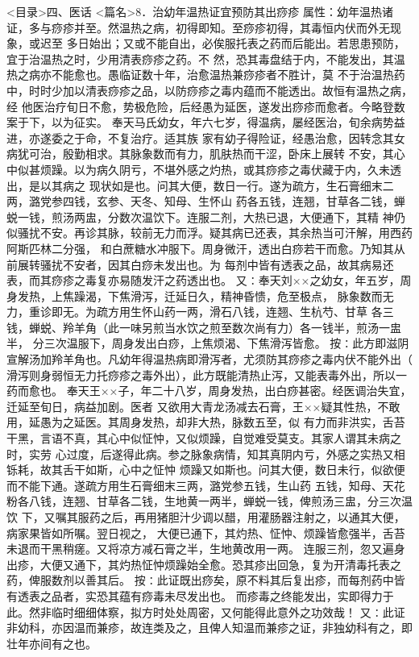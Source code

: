 \documentclass[a4paper,12pt,UTF8,twoside]{ctexbook}
\begin{document}
<目录>四、医话
<篇名>8．治幼年温热证宜预防其出痧疹
属性：幼年温热诸证，多与痧疹并至。然温热之病，初得即知。至痧疹初得，其毒恒内伏而外无现象，或迟至 
多日始出；又或不能自出，必俟服托表之药而后能出。若思患预防，宜于治温热之时，少用清表痧疹之药。不 
然，恐其毒盘结于内，不能发出，其温热之病亦不能愈也。愚临证数十年，治愈温热兼痧疹者不胜计，莫 
不于治温热药中，时时少加以清表痧疹之品，以防痧疹之毒内蕴而不能透出。故恒有温热之病，经 
他医治疗旬日不愈，势极危险，后经愚为延医，遂发出痧疹而愈者。今略登数案于下，以为征实。 
奉天马氏幼女，年六七岁，得温病，屡经医治，旬余病势益进，亦遂委之于命，不复治疗。适其族 
家有幼子得险证，经愚治愈，因转念其女病犹可治，殷勤相求。其脉象数而有力，肌肤热而干涩，卧床上展转 
不安，其心中似甚烦躁。以为病久阴亏，不堪外感之灼热，或其痧疹之毒伏藏于内，久未透出，是以其病之 
现状如是也。问其大便，数日一行。遂为疏方，生石膏细末二两，潞党参四钱，玄参、天冬、知母、生怀山 
药各五钱，连翘，甘草各二钱，蝉蜕一钱，煎汤两盅，分数次温饮下。连服二剂，大热已退，大便通下，其精 
神仍似骚扰不安。再诊其脉，较前无力而浮。疑其病已还表，其余热当可汗解，用西药阿斯匹林二分强， 
和白蔗糖水冲服下。周身微汗，透出白痧若干而愈。乃知其从前展转骚扰不安者，因其白痧未发出也。为 
每剂中皆有透表之品，故其病易还表，而其痧疹之毒复亦易随发汗之药透出也。 
又∶奉天刘××之幼女，年五岁，周身发热，上焦躁渴，下焦滑泻，迁延日久，精神昏愦，危至极点， 
脉象数而无力，重诊即无。为疏方用生怀山药一两，滑石八钱，连翘、生杭芍、甘草 
各三钱，蝉蜕、羚羊角（此一味另煎当水饮之煎至数次尚有力）各一钱半，煎汤一盅半， 
分三次温服下，周身发出白痧，上焦烦渴、下焦滑泻皆愈。 
按∶此方即滋阴宣解汤加羚羊角也。凡幼年得温热病即滑泻者，尤须防其痧疹之毒内伏不能外出（ 
滑泻则身弱恒无力托痧疹之毒外出），此方既能清热止泻，又能表毒外出，所以一药而愈也。 
奉天王××子，年二十八岁，周身发热，出白痧甚密。经医调治失宜，迁延至旬日，病益加剧。医者 
又欲用大青龙汤减去石膏，王××疑其性热，不敢用，延愚为之延医。其周身发热，却非大热，脉数五至，似 
有力而非洪实，舌苔干黑，言语不真，其心中似怔忡，又似烦躁，自觉难受莫支。其家人谓其未病之时，实劳 
心过度，后遂得此病。参之脉象病情，知其真阴内亏，外感之实热又相铄耗，故其舌干如斯，心中之怔忡 
烦躁又如斯也。问其大便，数日未行，似欲便而不能下通。遂疏方用生石膏细末三两，潞党参五钱，生山药 
五钱，知母、天花粉各八钱，连翘、甘草各二钱，生地黄一两半，蝉蜕一钱，俾煎汤三盅，分三次温饮 
下，又嘱其服药之后，再用猪胆汁少调以醋，用灌肠器注射之，以通其大便，病家果皆如所嘱。翌日视之， 
大便已通下，其灼热、怔忡、烦躁皆愈强半，舌苔未退而干黑稍瘥。又将凉方减石膏之半，生地黄改用一两。 
连服三剂，忽又遍身出疹，大便又通下，其灼热怔忡烦躁始全愈。恐其疹出回急，复为开清毒托表之 
药，俾服数剂以善其后。 
按∶此证既出痧矣，原不料其后复出疹，而每剂药中皆有透表之品者，实恐其蕴有痧毒未尽发出也。 
而疹毒之终能发出，实即得力于此。然非临时细细体察，拟方时处处周密，又何能得此意外之功效哉！ 
又∶此证非幼科，亦因温而兼疹，故连类及之，且俾人知温而兼疹之证，非独幼科有之，即 
壮年亦间有之也。 
\end{document}
